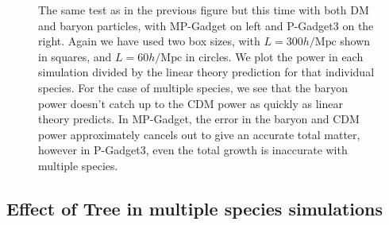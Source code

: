 \documentclass[]{article}
\begin{document}
\begin{figure}[h]
	\caption{The same test as in the previous figure but this time with both DM and baryon particles, with MP-Gadget on left and
P-Gadget3 on the right. Again we have used two box sizes, with $L=300h/\mathrm{Mpc}$ shown in squares,
and $L=60h/\mathrm{Mpc}$ in circles. We plot the power in each simulation divided by the linear theory
prediction for that individual species. For the case of multiple species, we see that the baryon power doesn't catch up to the CDM power as quickly as linear theory predicts. In MP-Gadget, the error in the baryon and CDM power approximately cancels out to give an accurate total matter, however in P-Gadget3, even the total growth is inaccurate with multiple species.}
\end{figure}

\clearpage

\subsection{Effect of Tree in multiple species simulations}
\end{document}
